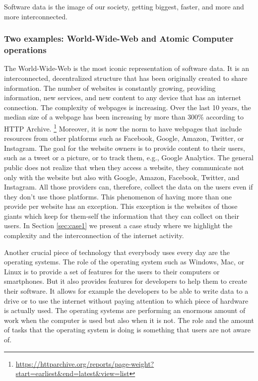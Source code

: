 \documentclass[manuscript,screen]{acmart}
\begin{document}
Software data is the image of our society, getting biggest, faster, and more and more interconnected. 

\subsubsection{Two examples: World-Wide-Web and Atomic Computer operations}

The World-Wide-Web is the most iconic representation of software data. 
It is an interconnected, decentralized structure that has been originally created to share information. 
The number of websites is constantly growing, providing information, new services, and new content to any device that has an internet connection.
The complexity of webpages is increasing.
Over the last 10 years, the median size of a webpage has been increasing by more than 300\% according to HTTP Archive. \footnote{\url{https://httparchive.org/reports/page-weight?start=earliest&end=latest&view=list}}
Moreover, it is now the norm to have webpages that include resources from other platforms such as Facebook, Google, Amazon, Twitter, or Instagram. 
The goal for the website owners is to provide content to their users, such as a tweet or a picture, or to track them, e.g., Google Analytics.
The general public does not realize that when they access a website, they communicate not only with the website but also with Google, Amazon, Facebook, Twitter, and Instagram.
All those providers can, therefore, collect the data on the users even if they don't use those platforms.
This phenomenon of having more than one provide per website has an exception. 
This exception is the websites of those giants which keep for them-self the information that they can collect on their users. In Section \ref{sec:case1} we present a case study where we highlight the complexity and the interconnection of the internet activity.

Another crucial piece of technology that everybody uses every day are the operating systems.
The role of the operating system such as Windows, Mac, or Linux is to provide a set of features for the users to their computers or smartphones.
But it also provides features for developers to help them to create their software. 
It allows for example the developers to be able to write data to a drive or to use the internet without paying attention to which piece of hardware is actually used. 
The operating systems are performing an enormous amount of work when the computer is used but also when it is not.
The role and the amount of tasks that the operating system is doing is something that users are not aware of. 
\end{document}
